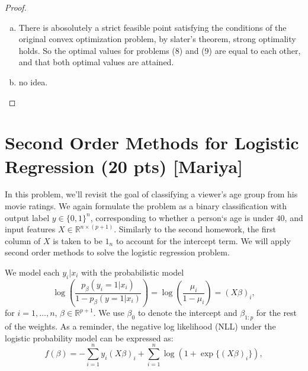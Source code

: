 \documentclass{article}
\theoremstyle{remark}
\theoremstyle{definition}
\begin{document}
\begin{proof}
\begin{enumerate}[(a)]
\item There is abosolutely a strict feasible point satisfying the conditions of the original convex optimization problem, by slater's theorem, strong optimality holds.
So the optimal values for problems (8) and (9) are equal to each other, and that both optimal values are attained.

\item no idea.
\end{enumerate}
     
\end{proof}



\section{Second Order Methods for Logistic Regression (20 pts) [Mariya]}

In this problem, we'll revisit the goal of classifying a viewer's age group from his movie ratings. We again formulate the problem as a binary classification with output label  $y \in \{0,1\}^n$, corresponding to whether a person`s age is under $40$, and input features $X \in \mathbb{R}^{n \times (p+1)}$. Similarly to the second homework, the first column of $X$ is taken to be $1_n$ to account for the intercept term. We will apply second order methods to solve the logistic regression problem.

We model each $y_i|x_i$
  with the probabilistic model
  \[
    \log\left(\frac{p_{\beta}(y_i = 1|x_i)}{1-p_{\beta}(y =
        1|x_i)}\right) = \log\left(\frac{\mu_i}{1-\mu_i}\right) = (X\beta)_i,
  \]
  for $i=1,\ldots,n$, $\beta \in \mathbb{R}^{p+1}$. We use $\beta_0$ to denote the intercept and $\beta_{1:p}$ for the rest of the weights. As a reminder, the negative log likelihood (NLL) under the logistic probability model can be expressed as: 
  \[
    f(\beta) = -\sum_{i=1}^{n}y_i(X\beta)_i + \sum_{i=1}^{n}\log(1 +
    \exp\{(X\beta)_i\}),
  \]
\end{document}
